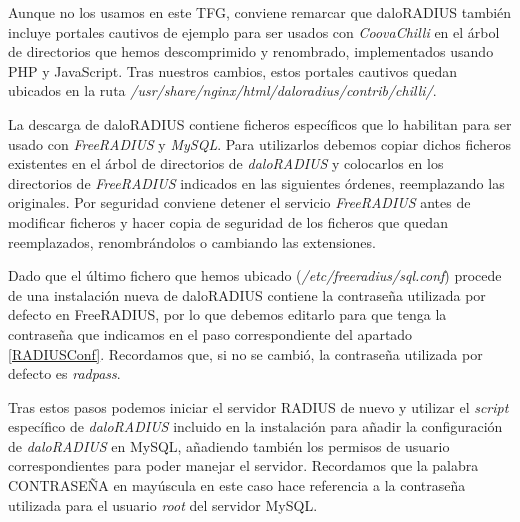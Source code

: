 Aunque no los usamos en este TFG, conviene remarcar que daloRADIUS también incluye portales cautivos de ejemplo para ser usados con \emph{CoovaChilli} en el árbol de directorios que hemos descomprimido y renombrado, implementados usando PHP y JavaScript. Tras nuestros cambios, estos portales cautivos quedan ubicados en la ruta \emph{/usr/share/nginx/html/daloradius/contrib/chilli/}.

La descarga de daloRADIUS contiene ficheros específicos que lo habilitan para ser usado con \emph{FreeRADIUS} y \emph{MySQL}. Para utilizarlos debemos copiar dichos ficheros existentes en el árbol de directorios de \emph{daloRADIUS} y colocarlos en los directorios de \emph{FreeRADIUS} indicados en las siguientes órdenes, reemplazando las originales. Por seguridad conviene detener el servicio \emph{FreeRADIUS} antes de modificar ficheros y hacer copia de seguridad de los ficheros que quedan reemplazados, renombrándolos o cambiando las extensiones.


Dado que el último fichero que hemos ubicado (\emph{/etc/freeradius/sql.conf}) procede de una instalación nueva de daloRADIUS contiene la contraseña utilizada por defecto en FreeRADIUS, por lo que debemos editarlo para que tenga la contraseña que indicamos en el paso correspondiente del apartado \ref{RADIUSConf}. Recordamos que, si no se cambió, la contraseña utilizada por defecto es \emph{radpass}.

Tras estos pasos podemos iniciar el servidor RADIUS de nuevo y utilizar el \emph{script} específico de \emph{daloRADIUS} incluido en la instalación para añadir la configuración de \emph{daloRADIUS} en MySQL, añadiendo también los permisos de usuario correspondientes para poder manejar el servidor. Recordamos que la palabra CONTRASEÑA en mayúscula en este caso hace referencia a la contraseña utilizada para el usuario \emph{root} del servidor MySQL.

